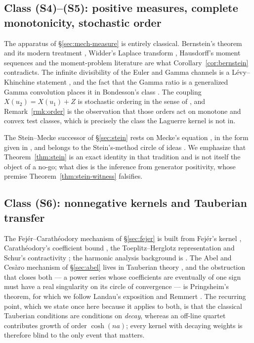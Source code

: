 \documentclass[11pt]{amsart}
\theoremstyle{definition}
\theoremstyle{remark}
\theoremstyle{definition}
\begin{document}
\subsection{Class (S4)--(S5): positive measures, complete monotonicity, stochastic order}

The apparatus of \S\ref{sec:mech-measure} is entirely classical. Bernstein's theorem
\cite{Bernstein} and its modern treatment \cite{SSV}, Widder's Laplace transform \cite{Widder},
Hausdorff's moment sequences \cite{Hausdorff} and the moment-problem literature
\cite{Akhiezer,ShohatTamarkin} are what Corollary~\ref{cor:bernstein} contradicts. The infinite
divisibility of the Euler and Gamma channels is a L\'evy--Khinchine statement
\cite{Sato,SteutelVanHarn,Feller}, and the fact that the Gamma ratio is a generalized Gamma
convolution places it in Bondesson's class \cite{Bondesson}. The coupling
$X(u_2)=X(u_1)+Z$ is stochastic ordering in the sense of \cite{ShakedShanthikumar,MullerStoyan},
and Remark~\ref{rmk:order} is the observation that those orders act on monotone and convex test
classes, which is precisely the class the Laguerre kernel is not in.

The Stein--Mecke successor of \S\ref{sec:stein} rests on Mecke's equation \cite{Mecke}, in the form
given in \cite{LastPenrose}, and belongs to the Stein's-method circle of ideas
\cite{ChenGoldsteinShao,BarbourChen,NourdinPeccati}. We emphasize that
Theorem~\ref{thm:stein} is an exact identity in that tradition and is not itself the object of a
no-go; what dies is the inference from generator positivity, whose premise
Theorem~\ref{thm:stein-witness} falsifies.

\subsection{Class (S6): nonnegative kernels and Tauberian transfer}

The Fej\'er--Carath\'eodory mechanism of \S\ref{sec:fejer} is built from Fej\'er's kernel
\cite{Fejer}, Carath\'eodory's coefficient bound \cite{Caratheodory}, the Toeplitz--Herglotz
representation \cite{Toeplitz,Herglotz} and Schur's contractivity \cite{Schur}; the harmonic
analysis background is \cite{Zygmund,Katznelson}. The Abel and Ces\`aro mechanism of
\S\ref{sec:abel} lives in Tauberian theory \cite{HardyDivergent,Korevaar}, and the obstruction that
closes both --- a power series whose coefficients are eventually of one sign must have a real
singularity on its circle of convergence --- is Pringsheim's theorem, for which we follow Landau's
exposition \cite{Landau} and Remmert \cite{Remmert}. The recurring point, which we state once here
because it applies to both, is that the classical Tauberian conditions are conditions on
\emph{decay}, whereas an off-line quartet contributes growth of order $\cosh(na)$; every kernel
with decaying weights is therefore blind to the only event that matters.
\end{document}

